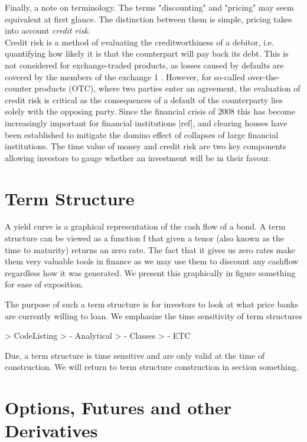 Finally, a note on terminology. The terms "discounting" and "pricing" 
may seem equivalent at first glance. The distinction between them is simple, 
pricing takes into account \emph{credit risk}. \\

Credit risk is a method of evaluating the creditworthiness of a debitor, i.e. 
quantifying
how likely it is that the counterpart will pay back its debt. This is not 
considered for
exchange-traded products, as losses caused by defaults are covered by the 
members of the exchange 1 . However, for so-called over-the-counter products 
(OTC), where two parties enter an agreement, the evaluation of credit risk is 
critical as the consequences of a default of the counterparty lies solely with 
the opposing party. Since the financial crisis of 2008 this has become 
increasingly important for financial institutions [ref], and clearing houses 
have been established to mitigate the domino effect of collapses of large 
financial institutions. The time value of money and credit risk are two key 
components allowing investors to gauge whether an investment will be in their 
favour.

\section{Term Structure}

A yield curve is a graphical representation of the cash flow of a bond.
A term structure can be viewed as a function f that given a tenor (also known 
as the time to maturity) returns an zero rate. The fact that it gives us zero 
rates make them very valuable tools in finance as we may use them to discount 
any cashflow regardless how it was generated.
We present this graphically in figure something for ease of exposition.

The purpose of such a term structure is for investors to look at what price 
banks are currently willing to loan. We emphasize the time sensitivity of term 
structures

> CodeListing
> 	- Analytical
>	- Classes
>	- ETC

Due, a term structure is time sensitive and are only valid at the time of 
construction. We will return to term structure construction in section 
something.

\section{Options, Futures and other Derivatives}


